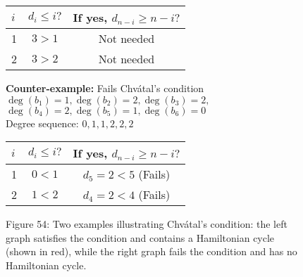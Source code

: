 \documentclass{article}
\theoremstyle{definition}
\begin{document}
\begin{figure}[h!]
\begin{center}
\begin{minipage}{0.48\textwidth}
\begin{center}
\begin{tabular}{lcc}
\toprule
$i$ & $d_i \leq i?$ & If yes, $d_{n-i} \geq n-i?$ \\
\midrule
1 & $3 > 1$ & Not needed \\
2 & $3 > 2$ & Not needed \\
\bottomrule
\end{tabular}
\end{center}
\end{minipage}
\hfill
\begin{minipage}{0.48\textwidth}
\centering
{}

\begin{center}
\textbf{Counter-example:} Fails Chvátal's condition\\
\small $\deg(b_1) = 1, \deg(b_2) = 2, \deg(b_3) = 2,$\\
\small $\deg(b_4) = 2, \deg(b_5) = 1, \deg(b_6) = 0$\\
Degree sequence: $0,1,1,2,2,2$

\begin{tabular}{lcc}
\toprule
$i$ & $d_i \leq i?$ & If yes, $d_{n-i} \geq n-i?$ \\
\midrule
1 & $0 < 1$ & $d_5 = 2 < 5$ (Fails) \\
2 & $1 < 2$ & $d_4 = 2 < 4$ (Fails) \\
\bottomrule
\end{tabular}
\end{center}
\end{minipage}
\small Figure 54: {Two examples illustrating Chvátal's condition: the left graph satisfies the condition and contains a Hamiltonian cycle (shown in red), while the right graph fails the condition and has no Hamiltonian cycle.}
\label{fig:53}
\end{center}
\end{figure}
\end{document}
